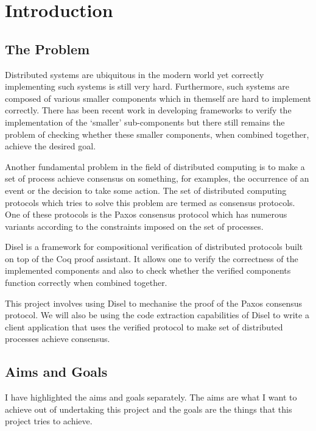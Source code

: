 \chapter{Introduction}

\section{The Problem}
Distributed systems are ubiquitous in the modern world yet
correctly implementing such systems is still very hard. Furthermore, such
systems are composed of various smaller components which in themself are
hard to implement correctly. There has been recent work in developing
frameworks to verify the implementation of the `smaller' sub-components
but there still remains the problem of checking whether these smaller
components, when combined together, achieve the desired goal.

Another fundamental problem in the field of distributed computing is to make
a set of process achieve consensus on something, for examples, the occurrence
of an event or the decision to take some action. The set of distributed
computing protocols which tries to solve this problem are termed as
consensus protocols. One of these protocols is the Paxos consensus protocol
which has numerous variants according to the constraints imposed on the
set of processes.

Disel is a framework for compositional verification of distributed
protocols built on top of the Coq proof assistant. It allows one to verify
the correctness of the implemented components and also to check whether
the verified components function correctly when combined together.

This project involves using Disel to mechanise the proof of the Paxos consensus protocol.
We will also be using the code extraction capabilities of Disel to
write a client application that uses the verified protocol to make set of
distributed processes achieve consensus.

\section{Aims and Goals}
I have highlighted the aims and goals separately. The aims are what I want to
achieve out of undertaking this project and the goals are the things that this
project tries to achieve.

